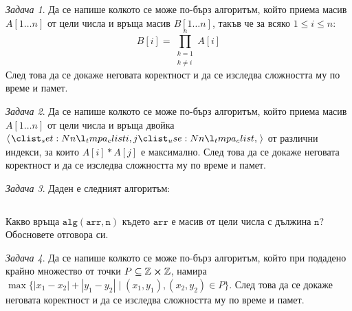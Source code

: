 \documentclass{article}
\theoremstyle{definition}
\theoremstyle{plain}
\theoremstyle{remark}
\newtheorem{problem}{Задача}
\theoremstyle{definition}
\begin{document}
\begin{problem}
Да се напише колкото се може по-бърз алгоритъм, който приема масив $A[1 \dots n]$ от цели числа и връща масив $B[1 \dots n]$, такъв че за всяко $1 \leq i \leq n$:
\[
  B[i] = \prod\limits_{\substack{k = 1 \\ k \neq i}}^n A[i]
\]
След това да се докаже неговата коректност и да се изследва сложността му по време и памет.
\end{problem}

\begin{problem}
Да се напише колкото се може по-бърз алгоритъм, който приема масив $A[1 \dots n]$ от цели числа и връща двойка $\opair{i, j}$ от различни индекси, за които $A[i] * A[j]$ е максимално.
След това да се докаже неговата коректност и да се изследва сложността му по време и памет.
\end{problem}

\begin{problem}
Даден е следният алгоритъм:
\inputminted[linenos]{c++}{algorithms/alg.cpp}
Какво връща $\mathtt{alg(arr, n)}$ където $\mathtt{arr}$ е масив от цели числа с дължина $\mathtt{n}$?
Обосновете отговора си.
\end{problem}

\begin{problem}
Да се напише колкото се може по-бърз алгоритъм, който при подадено крайно множество от точки $P \subseteq \mathbb{Z} \cross \mathbb{Z}$, намира $\max \{ |x_1 - x_2| + |y_1 - y_2| \mid (x_1, y_1), (x_2, y_2) \in P \}$.
След това да се докаже неговата коректност и да се изследва сложността му по време и памет.
\end{problem}
\end{document}
